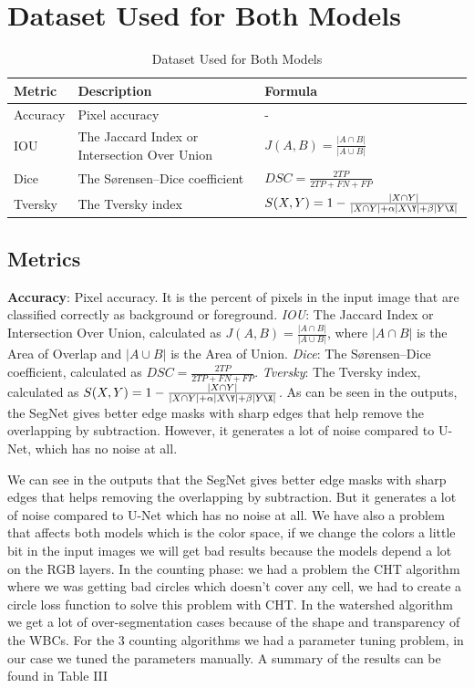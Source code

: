 \documentclass[conference]{IEEEtran}
\begin{document}
\section{Dataset Used for Both Models}
\begin{table}[htbp]
\centering
\caption{Dataset Used for Both Models}
\label{tab:dataset}
\begin{tabular}{lll}
\hline
Metric & Description & Formula \\
\hline
Accuracy & Pixel accuracy & - \\
IOU & The Jaccard Index or Intersection Over Union & $J(A, B) = \frac{|A \cap B|}{|A \cup B|}$ \\
Dice & The Sørensen–Dice coefficient & $DSC = \frac{2TP}{2TP + FN + FP}$ \\
Tversky & The Tversky index & $S(X, Y) = 1 - \frac{|X \cap Y|}{|X \cap Y| + \alpha|X\Y| + \beta|Y\X|}$ \\
\hline
\end{tabular}
\end{table}
\subsection{Metrics}
\textbf{Accuracy}: Pixel accuracy. It is the percent of pixels in the input image that are classified correctly as background or foreground.
\textit{IOU}: The Jaccard Index or Intersection Over Union, calculated as $J(A, B) = \frac{|A \cap B|}{|A \cup B|}$, where $|A \cap B|$ is the Area of Overlap and $|A \cup B|$ is the Area of Union.
\textit{Dice}: The Sørensen–Dice coefficient, calculated as $DSC = \frac{2TP}{2TP + FN + FP}$.
\textit{Tversky}: The Tversky index, calculated as $S(X, Y) = 1 - \frac{|X \cap Y|}{|X \cap Y| + \alpha|X\Y| + \beta|Y\X|}$.
As can be seen in the outputs, the SegNet gives better edge masks with sharp edges that help remove the overlapping by subtraction. However, it generates a lot of noise compared to U-Net, which has no noise at all.

We can see in the outputs that the SegNet gives better edge masks with sharp edges that helps removing the overlapping by subtraction. But it generates a lot of noise compared to U-Net which has no noise at all.
We have also a problem that affects both models which is the color space, if we change the colors a little bit in the input images we will get bad results because the models depend a lot on the RGB layers.
In the counting phase: we had a problem the CHT algorithm where we was getting bad circles which doesn’t cover any cell, we had to create a circle loss function to solve this problem with CHT. In the watershed algorithm we get a lot of over-segmentation cases because of the shape and transparency of the WBCs. For the 3 counting algorithms we had a parameter tuning problem, in our case we tuned the parameters manually. A summary of the results can be found in Table III
\end{document}
